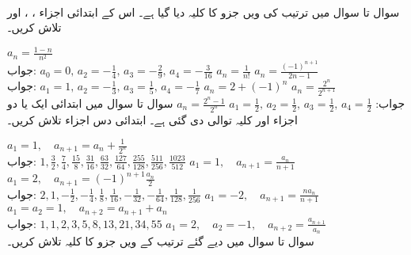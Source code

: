 \\
سوال  تا سوال  میں ترتیب کی  ویں جزو کا کلیہ دیا گیا ہے۔ اس کے ابتدائی اجزاء ، ،  اور  تلاش کریں۔

$a_n=\frac{1-n}{n^2}$\\
جواب:\quad
$a_0=0,\, a_2=-\tfrac{1}{4},\,a_3=-\tfrac{2}{9},\,a_4=-\tfrac{3}{16}$
$a_n=\frac{1}{n!}$
$a_n=\frac{(-1)^{n+1}}{2n-1}$\\
جواب:\quad
$a_1=1,\,a_2=-\tfrac{1}{3},\,a_3=\tfrac{1}{5},\,a_4=-\tfrac{1}{7}$
$a_n=2+(-1)^n$
$a_n=\frac{2^n}{2^{n+1}}$\\
جواب:\quad
$a_1=\tfrac{1}{2},\,a_2=\tfrac{1}{2},\,a_3=\tfrac{1}{2},\,a_4=\tfrac{1}{2}$
$a_n=\frac{2^n-1}{2^n}$
سوال  تا سوال  میں ابتدائی ایک یا دو اجزاء اور کلیہ توالی دی گئی ہے۔ ابتدائی دس اجزاء تلاش کریں۔

$a_1=1,\quad a_{n+1}=a_n+\frac{1}{2^n}$\\
جواب:\quad
$1,\tfrac{3}{2},\tfrac{7}{4},\tfrac{15}{8},\tfrac{31}{16},\tfrac{63}{32},\tfrac{127}{64},\tfrac{255}{128},\tfrac{511}{256},\tfrac{1023}{512}$
$a_1=1,\quad a_{n+1}=\frac{a_n}{n+1}$
$a_1=2,\quad a_{n+1}=(-1)^{n+1}\frac{a_n}{2}$\\
جواب:\quad
$2,1,-\tfrac{1}{2},-\tfrac{1}{4},\tfrac{1}{8},\tfrac{1}{16},-\tfrac{1}{32},-\tfrac{1}{64},\tfrac{1}{128},\tfrac{1}{256}$
$a_1=-2,\quad a_{n+1}=\frac{na_n}{n+1}$
$a_1=a_2=1,\quad a_{n+2}=a_{n+1}+a_n$\\
جواب:\quad
$1,1,2,3,5,8,13,21,34,55$
$a_1=2,\quad a_2=-1,\quad a_{n+2}=\frac{a_{n+1}}{a_n}$
\\
سوال  تا سوال  میں دیے گئے ترتیب کے  ویں جزو کا کلیہ تلاش کریں۔


